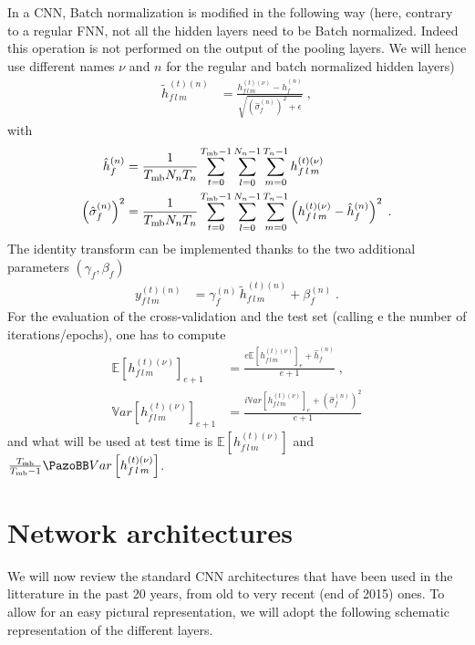 In a CNN, Batch normalization is modified in the following way (here, contrary to a regular FNN, not all the hidden layers need to be Batch normalized. Indeed this operation is not performed on the output of the pooling layers. We will hence use different names $\nu$ and $n$ for the regular and batch normalized hidden layers) 
\begin{align}
\tilde{h}_{f\,l\,m}^{(t)(n)}&=\frac{h_{f\,l\,m}^{(t)(\nu)}-\hat{h}_{f}^{(n)}}
%
{\sqrt{\left(\hat{\sigma}_{f}^{(n)}\right)^2+\epsilon}}\;,
\end{align}
with
\begin{align}
\hat{h}_{f}^{(n)}&=
%
\frac{1}{T_{{\rm mb}}N_nT_n}\sum^{T_{{\rm mb}}-1}_{t=0}\sum^{N_n-1}_{l=0}\sum^{T_n-1}_{m=0}h_{f\,l\,m}^{(t)(\nu)}\\
%
\left(\hat{\sigma}_{f}^{(n)}\right)^2&=\frac{1}{T_{{\rm mb}}N_nT_n}\sum^{T_{{\rm mb}}-1}_{t=0}
%
\sum^{N_n-1}_{l=0}\sum^{T_n-1}_{m=0}\left(h_{f\,l\,m}^{(t)(\nu)}-\hat{h}_{f}^{(n)}\right)^2\;.
\end{align}
The identity transform can be implemented thanks to the two additional parameters $(\gamma_f,\beta_f)$ 
\begin{align}
y^{(t)(n)}_{f\,l\,m}&=\gamma^{(n)}_f\,\tilde{h}_{f\,l\,m}^{(t)(n)}+\beta^{(n)}_f\;.
\end{align}
For the evaluation of the cross-validation and the test set (calling e the number of iterations/epochs), one has to compute
\begin{align}
\mathbb{E}\left[h_{f\,l\,m}^{(t)(\nu)}\right]_{e+1} &=
%
\frac{e\mathbb{E}\left[h_{f\,l\,m}^{(t)(\nu)}\right]_{e}+\hat{h}_{f}^{(n)}}{e+1}\;,\\
%
\mathbb{V}ar\left[h_{f\,l\,m}^{(t)(\nu)}\right]_{e+1} &=
%
\frac{i\mathbb{V}ar\left[h_{f\,l\,m}^{(t)(\nu)}\right]_{e}+\left(\hat{\sigma}_{f}^{(n)}\right)^2}{e+1}
\end{align}
and what will be used at test time is $\mathbb{E}\left[h_{f\,l\,m}^{(t)(\nu)}\right]$ and $\frac{T_{{\rm mb}}}{T_{{\rm mb}}-1}\mathbb{V}ar\left[h_{f\,l\,m}^{(t)(\nu)}\right]$.


\section{Network architectures}

We will now review the standard CNN architectures that have been used in the litterature in the past 20 years, from old to very recent (end of 2015) ones. To allow for an easy pictural representation, we will adopt the following schematic representation of the different layers.

